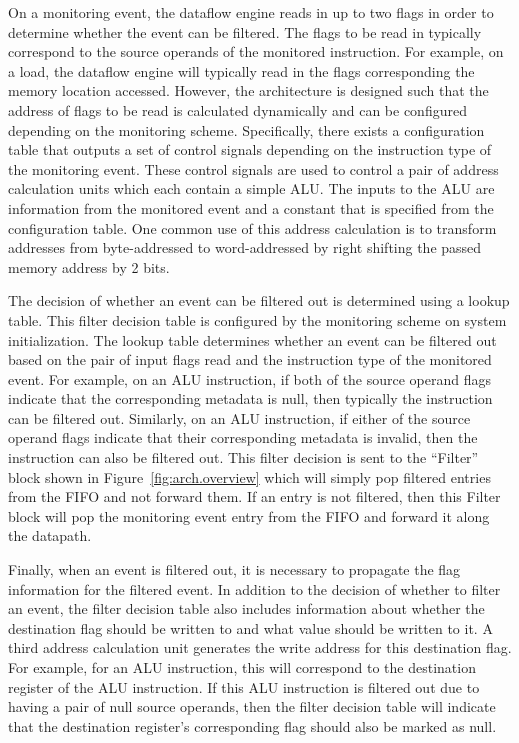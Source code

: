 On a monitoring event, the dataflow engine reads in up to two flags in order to
determine whether the event can be filtered.  The flags to be read in typically correspond to the source
operands of the monitored instruction. For example, on a load, the dataflow
engine will typically read in the flags corresponding the memory location
accessed.
However, the architecture is designed such that the address of flags to be read
is calculated dynamically and can be configured depending on the monitoring
scheme. Specifically, there exists a configuration table that outputs a set of
control signals depending on the instruction type of the monitoring event.
These control signals are used to control a pair of address calculation units which each
contain a simple ALU. The inputs to the ALU are information from the monitored
event and a constant that is specified from the configuration table. One common
use of this address calculation is to transform addresses from byte-addressed
to word-addressed by right shifting the passed memory address by 2 bits.

The decision of whether an event can be filtered out is determined using a
lookup table. This filter decision table is configured by the monitoring scheme
on system initialization. The lookup table determines whether an event can be
filtered out based on the pair of input flags read and the instruction type of
the monitored event.
For example, on an ALU instruction, if both of the source operand flags
indicate that the corresponding metadata is null, then typically the instruction can be
filtered out. Similarly, on an ALU instruction, if either of the source operand
flags indicate that their corresponding metadata is invalid, then the
instruction can also be filtered out. This filter decision is sent to the
``Filter'' block shown in Figure~\ref{fig:arch.overview} which will simply pop
filtered entries from the FIFO and not forward them. If an entry is not
filtered, then this Filter block will pop the monitoring event entry from the
FIFO and forward it along the datapath.

Finally, when an event is filtered out, it is necessary to propagate the flag
information for the filtered event. In addition to the decision of whether to
filter an event, the filter decision table also includes information about
whether the destination flag should be written to and what value should be
written to it. A third address calculation unit generates the write address for
this destination flag. For example, for an ALU instruction, this will
correspond to the destination register of the ALU instruction. If this ALU
instruction is filtered out due to having a pair of null source operands, then
the filter decision table will indicate that the destination register's
corresponding flag should also be marked as null. 

